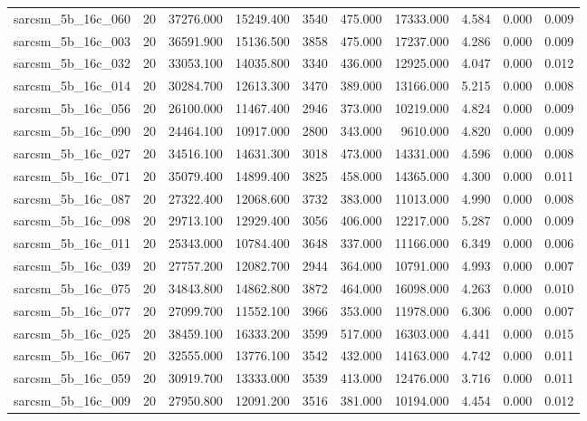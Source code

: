 \begin{tabular}{lrrrrrrrrr}
sarcsm\_5b\_16c\_060 & 20 & 37276.000 & 15249.400 & 3540 & 475.000 & 17333.000 & 4.584 & 0.000 & 0.009 \\
sarcsm\_5b\_16c\_003 & 20 & 36591.900 & 15136.500 & 3858 & 475.000 & 17237.000 & 4.286 & 0.000 & 0.009 \\
sarcsm\_5b\_16c\_032 & 20 & 33053.100 & 14035.800 & 3340 & 436.000 & 12925.000 & 4.047 & 0.000 & 0.012 \\
sarcsm\_5b\_16c\_014 & 20 & 30284.700 & 12613.300 & 3470 & 389.000 & 13166.000 & 5.215 & 0.000 & 0.008 \\
sarcsm\_5b\_16c\_056 & 20 & 26100.000 & 11467.400 & 2946 & 373.000 & 10219.000 & 4.824 & 0.000 & 0.009 \\
sarcsm\_5b\_16c\_090 & 20 & 24464.100 & 10917.000 & 2800 & 343.000 & 9610.000 & 4.820 & 0.000 & 0.009 \\
sarcsm\_5b\_16c\_027 & 20 & 34516.100 & 14631.300 & 3018 & 473.000 & 14331.000 & 4.596 & 0.000 & 0.008 \\
sarcsm\_5b\_16c\_071 & 20 & 35079.400 & 14899.400 & 3825 & 458.000 & 14365.000 & 4.300 & 0.000 & 0.011 \\
sarcsm\_5b\_16c\_087 & 20 & 27322.400 & 12068.600 & 3732 & 383.000 & 11013.000 & 4.990 & 0.000 & 0.008 \\
sarcsm\_5b\_16c\_098 & 20 & 29713.100 & 12929.400 & 3056 & 406.000 & 12217.000 & 5.287 & 0.000 & 0.009 \\
sarcsm\_5b\_16c\_011 & 20 & 25343.000 & 10784.400 & 3648 & 337.000 & 11166.000 & 6.349 & 0.000 & 0.006 \\
sarcsm\_5b\_16c\_039 & 20 & 27757.200 & 12082.700 & 2944 & 364.000 & 10791.000 & 4.993 & 0.000 & 0.007 \\
sarcsm\_5b\_16c\_075 & 20 & 34843.800 & 14862.800 & 3872 & 464.000 & 16098.000 & 4.263 & 0.000 & 0.010 \\
sarcsm\_5b\_16c\_077 & 20 & 27099.700 & 11552.100 & 3966 & 353.000 & 11978.000 & 6.306 & 0.000 & 0.007 \\
sarcsm\_5b\_16c\_025 & 20 & 38459.100 & 16333.200 & 3599 & 517.000 & 16303.000 & 4.441 & 0.000 & 0.015 \\
sarcsm\_5b\_16c\_067 & 20 & 32555.000 & 13776.100 & 3542 & 432.000 & 14163.000 & 4.742 & 0.000 & 0.011 \\
sarcsm\_5b\_16c\_059 & 20 & 30919.700 & 13333.000 & 3539 & 413.000 & 12476.000 & 3.716 & 0.000 & 0.011 \\
sarcsm\_5b\_16c\_009 & 20 & 27950.800 & 12091.200 & 3516 & 381.000 & 10194.000 & 4.454 & 0.000 & 0.012 \\

\end{tabular}
